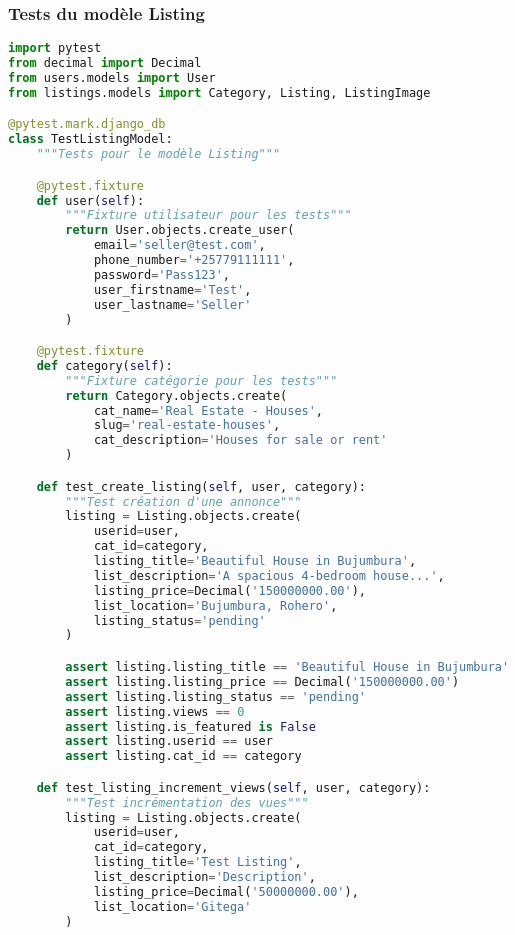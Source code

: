 \subsubsection{Tests du modèle Listing}

\begin{lstlisting}[language=Python, caption=listings/tests/test\_models.py]
import pytest
from decimal import Decimal
from users.models import User
from listings.models import Category, Listing, ListingImage

@pytest.mark.django_db
class TestListingModel:
    """Tests pour le modèle Listing"""

    @pytest.fixture
    def user(self):
        """Fixture utilisateur pour les tests"""
        return User.objects.create_user(
            email='seller@test.com',
            phone_number='+25779111111',
            password='Pass123',
            user_firstname='Test',
            user_lastname='Seller'
        )

    @pytest.fixture
    def category(self):
        """Fixture catégorie pour les tests"""
        return Category.objects.create(
            cat_name='Real Estate - Houses',
            slug='real-estate-houses',
            cat_description='Houses for sale or rent'
        )

    def test_create_listing(self, user, category):
        """Test création d'une annonce"""
        listing = Listing.objects.create(
            userid=user,
            cat_id=category,
            listing_title='Beautiful House in Bujumbura',
            list_description='A spacious 4-bedroom house...',
            listing_price=Decimal('150000000.00'),
            list_location='Bujumbura, Rohero',
            listing_status='pending'
        )

        assert listing.listing_title == 'Beautiful House in Bujumbura'
        assert listing.listing_price == Decimal('150000000.00')
        assert listing.listing_status == 'pending'
        assert listing.views == 0
        assert listing.is_featured is False
        assert listing.userid == user
        assert listing.cat_id == category

    def test_listing_increment_views(self, user, category):
        """Test incrémentation des vues"""
        listing = Listing.objects.create(
            userid=user,
            cat_id=category,
            listing_title='Test Listing',
            list_description='Description',
            listing_price=Decimal('50000000.00'),
            list_location='Gitega'
        )


\end{lstlisting}
